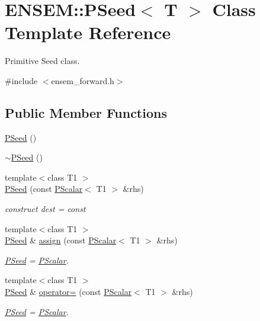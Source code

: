 \hypertarget{classENSEM_1_1PSeed}{}\section{E\+N\+S\+EM\+:\+:P\+Seed$<$ T $>$ Class Template Reference}
\label{classENSEM_1_1PSeed}


Primitive Seed class.  




{\ttfamily \#include $<$ensem\+\_\+forward.\+h$>$}

\subsection*{Public Member Functions}
\begin{DoxyCompactItemize}
\item 
\mbox{\hyperlink{classENSEM_1_1PSeed_a23818769d84caba2047eaf425f2073f1}{P\+Seed}} ()
\item 
\mbox{\hyperlink{classENSEM_1_1PSeed_a6796252e24ea4c2ec43bf2600f2ffdc7}{$\sim$\+P\+Seed}} ()
\item 
{\footnotesize template$<$class T1 $>$ }\\\mbox{\hyperlink{classENSEM_1_1PSeed_a0c2df1585f47479069319dd97de9c4ea}{P\+Seed}} (const \mbox{\hyperlink{classENSEM_1_1PScalar}{P\+Scalar}}$<$ T1 $>$ \&rhs)
\begin{DoxyCompactList}\small\item\em construct dest = const \end{DoxyCompactList}\item 
{\footnotesize template$<$class T1 $>$ }\\\mbox{\hyperlink{classENSEM_1_1PSeed}{P\+Seed}} \& \mbox{\hyperlink{classENSEM_1_1PSeed_a8d74bd21af23dfb165937c3bb546ea8f}{assign}} (const \mbox{\hyperlink{classENSEM_1_1PScalar}{P\+Scalar}}$<$ T1 $>$ \&rhs)
\begin{DoxyCompactList}\small\item\em \mbox{\hyperlink{classENSEM_1_1PSeed}{P\+Seed}} = \mbox{\hyperlink{classENSEM_1_1PScalar}{P\+Scalar}}. \end{DoxyCompactList}\item 
{\footnotesize template$<$class T1 $>$ }\\\mbox{\hyperlink{classENSEM_1_1PSeed}{P\+Seed}} \& \mbox{\hyperlink{classENSEM_1_1PSeed_aa7d9ec1f6a7cca8ee109c29d75482350}{operator=}} (const \mbox{\hyperlink{classENSEM_1_1PScalar}{P\+Scalar}}$<$ T1 $>$ \&rhs)
\begin{DoxyCompactList}\small\item\em \mbox{\hyperlink{classENSEM_1_1PSeed}{P\+Seed}} = \mbox{\hyperlink{classENSEM_1_1PScalar}{P\+Scalar}}. \end{DoxyCompactList}\item 

\end{DoxyCompactItemize}
